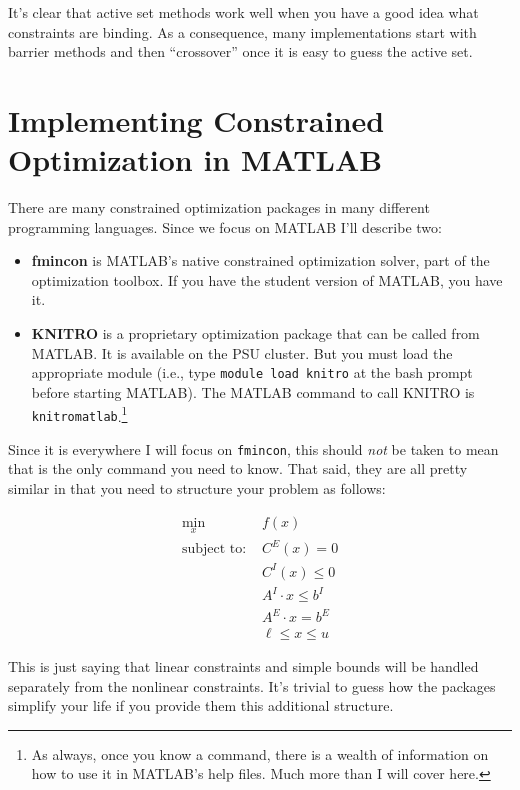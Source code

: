 \documentclass[twoside]{article}
\begin{document}
It's clear that active set methods work well when you have a good idea what constraints are binding. As a consequence, many implementations start with barrier methods and then ``crossover'' once it is easy to guess the active set. 

\section{Implementing Constrained Optimization in MATLAB}

There are many constrained optimization packages in many different programming languages. Since we focus on MATLAB I'll describe two: 
\begin{itemize}
\item {\bf fmincon} is MATLAB's native constrained optimization solver, part of the optimization toolbox.  If you have the student version of MATLAB, you have it. 
\item {\bf KNITRO} is a proprietary optimization package that can be called from MATLAB.  It is available on the PSU cluster. But you must load the appropriate module (i.e., type {\tt module load knitro} at the bash prompt before starting MATLAB). The MATLAB command to call KNITRO is {\tt knitromatlab}.\footnote{As always, once you know a command, there is a wealth of information on how to use it in MATLAB's help files. Much more than I will cover here.}
\end{itemize}

Since it is everywhere I will focus on {\tt fmincon}, this should {\it not} be taken to mean that is the only command you need to know.  That said, they are all pretty similar in that you need to structure your problem as follows: 

\begin{align*}
\min_x & f(x) \\
\mbox{subject to: } & C^E(x) = 0 \\
& C^I(x) \leq 0 \\ 
& A^I \cdot x \leq b^I \\
& A^E \cdot x = b^E \\
& \ell \leq x \leq u
\end{align*}

This is just saying that linear constraints and simple bounds will be handled separately from the nonlinear constraints. It's trivial to guess how the packages
simplify your life if you provide them this additional structure. 
\end{document}
